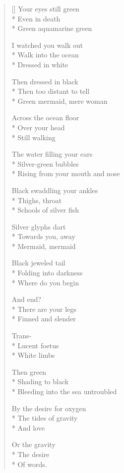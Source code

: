 \label{ch:lastsilences}
\settowidth{\versewidth}{Bleeding into the sea untroubled}
\begin{verse}[\versewidth]
Your eyes still green\\*
Even in death\\*
Green \quad aquamarine \quad green

I watched you walk out\\*
Walk into the ocean\\*
Dressed in white

Then dressed in black\\*
Then too distant to tell\\*
Green mermaid, mere woman

Across the ocean floor\\*
Over your head\\*
Still walking

The water filling your ears\\*
Silver-green bubbles\\*
Rising from your mouth and nose

Black swaddling your ankles\\*
Thighs, throat\\*
Schools of silver fish

Silver glyphs dart\\*
Towards you, away\\*
Mermaid, mermaid

Black jeweled tail\\*
Folding into darkness\\*
Where do you begin

And end?\\*
There are your legs\\*
Finned and slender

Trans-\\*
Lucent  foetus\\*
White limbs

Then green\\*
Shading to black\\*
Bleeding into the sea untroubled

By the desire for oxygen\\*
The tides of gravity\\*
And love

Or the gravity\\*
The desire\\*
Of words.  
\end{verse}
